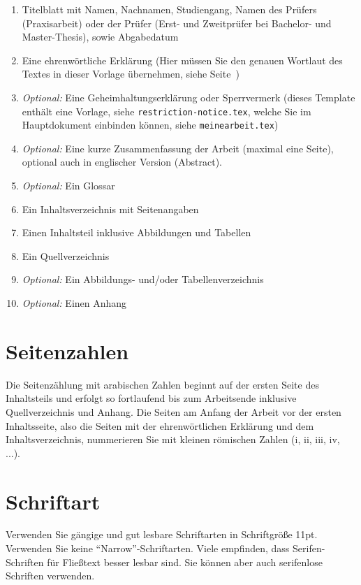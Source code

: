 \begin{enumerate}
    \item Titelblatt mit Namen, Nachnamen, Studiengang, Namen des Prüfers (Praxisarbeit) oder der Prüfer (Erst- und Zweitprüfer bei Bachelor- und Master-Thesis), sowie Abgabedatum
    \item Eine ehrenwörtliche Erklärung (Hier müssen Sie den genauen Wortlaut des Textes in dieser Vorlage übernehmen, siehe Seite~\pageref{chap:erklaerung-selbstaendigkeit})
    \item \textit{Optional:} Eine Geheimhaltungserklärung oder Sperrvermerk (dieses Template enthält eine Vorlage, siehe \texttt{restriction-notice.tex}, welche Sie im Hauptdokument einbinden können, siehe \texttt{meinearbeit.tex})
    \item \textit{Optional:} Eine kurze Zusammenfassung der Arbeit (maximal eine Seite), optional auch in englischer Version (Abstract).
    \item  \textit{Optional:} Ein Glossar
    \item Ein Inhaltsverzeichnis mit Seitenangaben
    \item Einen Inhaltsteil inklusive Abbildungen und Tabellen
    \item Ein Quellverzeichnis
    \item \textit{Optional:} Ein Abbildungs- und/oder Tabellenverzeichnis
    \item \textit{Optional:} Einen Anhang
\end{enumerate}

\section{Seitenzahlen}

Die Seitenzählung mit arabischen Zahlen beginnt auf der ersten Seite des Inhaltsteils und erfolgt so fortlaufend bis zum Arbeitsende inklusive Quellverzeichnis und Anhang. Die Seiten am Anfang der Arbeit vor der ersten Inhaltsseite, also die Seiten mit der ehrenwörtlichen Erklärung und dem Inhaltsverzeichnis, nummerieren Sie mit kleinen römischen Zahlen (i, ii, iii, iv, ...).

\section{Schriftart}

Verwenden Sie gängige und gut lesbare Schriftarten in Schriftgröße 11pt. Verwenden Sie keine \enquote{Narrow}-Schriftarten. Viele empfinden, dass Serifen-Schriften für Fließtext besser lesbar sind. Sie können aber auch serifenlose Schriften verwenden. 

